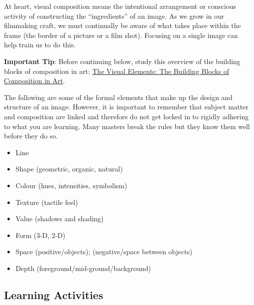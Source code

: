 \documentclass[
]{book}
\providecommand{\tightlist}{%
  \setlength{\itemsep}{0pt}\setlength{\parskip}{0pt}}
\begin{document}
At heart, visual composition means the intentional arrangement or conscious activity of constructing the ``ingredients'' of an image. As we grow in our filmmaking craft, we must continually be aware of what takes place within the frame (the border of a picture or a film shot). Focusing on a single image can help train us to do this.

\begin{caution}
\textbf{Important Tip}: Before continuing below, study this overview of the building blocks of composition in art: \href{http://www.artyfactory.com/art_appreciation/visual-elements/visual-elements.html}{The Visual Elements: The Building Blocks of Composition in Art}.
\end{caution}

The following are some of the formal elements that make up the design and structure of an image. However, it is important to remember that subject matter and composition are linked and therefore do not get locked in to rigidly adhering to what you are learning. Many masters break the rules but they know them well before they do so.

\begin{itemize}
\tightlist
\item
  Line\\
\item
  Shape (geometric, organic, natural)\\
\item
  Colour (hues, intensities, symbolism)\\
\item
  Texture (tactile feel)\\
\item
  Value (shadows and shading)\\
\item
  Form (3-D, 2-D)\\
\item
  Space (positive/objects); (negative/space between objects)\\
\item
  Depth (foreground/mid-ground/background)
\end{itemize}

\hypertarget{learning-activities-7}{%
\subsection*{Learning Activities}\label{learning-activities-7}}
\end{document}
